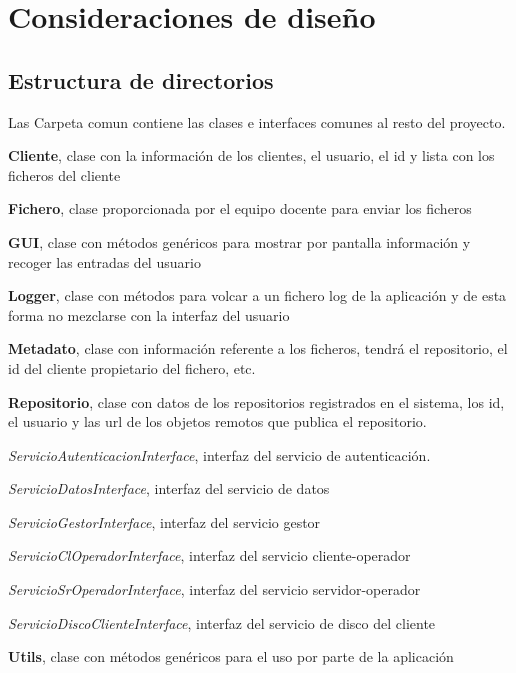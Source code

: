 \chapter{Consideraciones de diseño}

\section{Estructura de directorios}

Las Carpeta comun contiene las clases e interfaces comunes al resto del proyecto.

\begin{compactitem}
	\item \textbf{Cliente}, clase con la información de los clientes, el usuario, el id y lista con los ficheros del cliente
	\item \textbf{Fichero}, clase proporcionada por el equipo docente para enviar los ficheros
	\item \textbf{GUI}, clase con métodos genéricos para mostrar por pantalla información y recoger las entradas del usuario
	\item \textbf{Logger}, clase con métodos para volcar a un fichero log de la aplicación y de esta forma no mezclarse con la interfaz del usuario
	\item \textbf{Metadato}, clase con información referente a los ficheros, tendrá el repositorio, el id del cliente propietario del fichero, etc.
	\item \textbf{Repositorio}, clase con datos de los repositorios registrados en el sistema, los id, el usuario y las url de los objetos remotos que publica el repositorio.
	\item \textit{ServicioAutenticacionInterface}, interfaz del servicio de autenticación.
	\item \textit{ServicioDatosInterface}, interfaz del servicio de datos
	\item \textit{ServicioGestorInterface}, interfaz del servicio gestor
	\item \textit{ServicioClOperadorInterface}, interfaz del servicio cliente-operador
	\item \textit{ServicioSrOperadorInterface}, interfaz del servicio servidor-operador
	\item \textit{ServicioDiscoClienteInterface}, interfaz del servicio de disco del cliente
	\item \textbf{Utils}, clase con métodos genéricos para el uso por parte de la aplicación
\end{compactitem}

